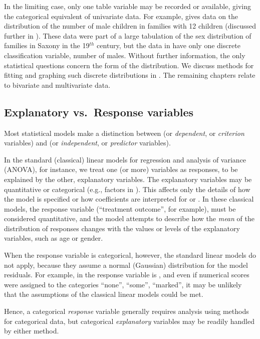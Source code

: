 \documentclass[10pt,krantz2]{krantz}\usepackage[]{graphicx}\usepackage[]{color}
\begin{document}
In the limiting case, only one table variable may be recorded or
available, giving the categorical equivalent of univariate data.
For example,  gives data on the distribution
of the number of male children in families with 12 children
(discussed further in ).
These data were part of a large tabulation of the sex distribution
of families in Saxony in the 19$^{th}$ century, but the data in 
have only one discrete classification variable, number of males.
Without further information, the only statistical questions concern
the form of the distribution.
We discuss methods for fitting and graphing such discrete distributions
in .
The remaining chapters relate to bivariate and multivariate data.


\subsection{Explanatory vs.\ Response variables}\label{sec:exp-resp}
Most statistical models make a distinction between 
(or \emph{dependent}, or \emph{criterion} variables)
and
(or \emph{independent}, or \emph{predictor} variables).

In the standard (classical) linear models for regression and analysis of variance
(ANOVA), for instance, we treat one (or more) variables as responses,
to be explained by the other, explanatory variables.
The explanatory variables may be quantitative or categorical
(e.g., factors in \R).
This affects only the details of how the model is specified
or how coefficients are interpreted for
 or .  In these classical models,
the response variable (``treatment outcome'', for example), must be
considered quantitative,  and the model attempts to describe how the
\emph{mean} of the distribution of responses changes with the values
or levels of the explanatory variables, such as age or gender.

When the response variable is categorical, however, the standard linear
models do not apply, because they assume a normal (Gaussian) distribution
for the model residuals.  For example, in 
the response variable
is , and even if numerical scores were assigned
to the categories ``none'', ``some'', ``marked'', it may be unlikely
that the assumptions of the classical linear models could be met.

Hence, a categorical \emph{response} variable generally requires analysis
using methods for categorical data, but categorical \emph{explanatory} variables
may be readily handled by either method.
\end{document}
